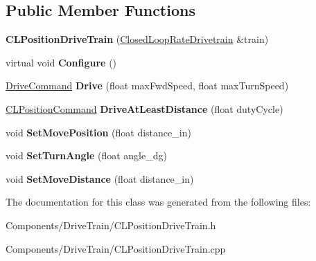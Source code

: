 \subsection*{\-Public \-Member \-Functions}
\begin{DoxyCompactItemize}
\item 
\hypertarget{class_c_l_position_drive_train_aa9de32bb180ef4a456cbe6373b18783f}{
{\bfseries \-C\-L\-Position\-Drive\-Train} (\hyperlink{class_closed_loop_rate_drivetrain}{\-Closed\-Loop\-Rate\-Drivetrain} \&train)}
\label{class_c_l_position_drive_train_aa9de32bb180ef4a456cbe6373b18783f}

\item 
\hypertarget{class_c_l_position_drive_train_ad02b281d4787da186cacb7861fe05f7b}{
virtual void {\bfseries \-Configure} ()}
\label{class_c_l_position_drive_train_ad02b281d4787da186cacb7861fe05f7b}

\item 
\hypertarget{class_c_l_position_drive_train_ad20627384860054aa281b9d0013d9715}{
\hyperlink{struct_drive_command}{\-Drive\-Command} {\bfseries \-Drive} (float max\-Fwd\-Speed, float max\-Turn\-Speed)}
\label{class_c_l_position_drive_train_ad20627384860054aa281b9d0013d9715}

\item 
\hypertarget{class_c_l_position_drive_train_aedcfe50dbf3f647af10e18fe56476489}{
\hyperlink{struct_c_l_position_command}{\-C\-L\-Position\-Command} {\bfseries \-Drive\-At\-Least\-Distance} (float duty\-Cycle)}
\label{class_c_l_position_drive_train_aedcfe50dbf3f647af10e18fe56476489}

\item 
\hypertarget{class_c_l_position_drive_train_aecd5e8dd9247edd2c38bde30e92ab23a}{
void {\bfseries \-Set\-Move\-Position} (float distance\-\_\-in)}
\label{class_c_l_position_drive_train_aecd5e8dd9247edd2c38bde30e92ab23a}

\item 
\hypertarget{class_c_l_position_drive_train_af11ab1e144153afb478142d1aae1cd23}{
void {\bfseries \-Set\-Turn\-Angle} (float angle\-\_\-dg)}
\label{class_c_l_position_drive_train_af11ab1e144153afb478142d1aae1cd23}

\item 
\hypertarget{class_c_l_position_drive_train_a10967f59261320410c2c46a6282dfcc7}{
void {\bfseries \-Set\-Move\-Distance} (float distance\-\_\-in)}
\label{class_c_l_position_drive_train_a10967f59261320410c2c46a6282dfcc7}

\end{DoxyCompactItemize}


\-The documentation for this class was generated from the following files\-:\begin{DoxyCompactItemize}
\item 
\-Components/\-Drive\-Train/\-C\-L\-Position\-Drive\-Train.\-h\item 
\-Components/\-Drive\-Train/\-C\-L\-Position\-Drive\-Train.\-cpp\end{DoxyCompactItemize}
